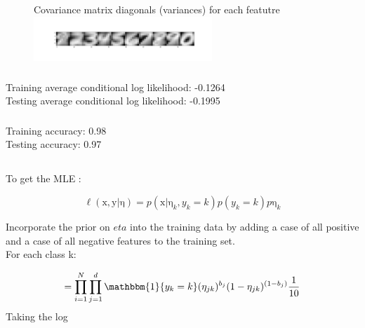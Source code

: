 \documentclass[12pt,letterpaper]{article} %
\newcommand{\bs}[1]{\bm{\mathrm{#1}}} %
\newcommand{\switch}[0]{\mathbbm{1}\{y_k=k\}}
\begin{document}
   \clearpage
  
  \subsubsection{}{}
  \begin{figure}[!h]
  \centering
  \caption{}{  Covariance matrix diagonals (variances) for each featutre}
   \includegraphics[width=0.6\textwidth, trim={3in 0in 0in 0in},clip=true ]{q2_2_eta.png}
\end{figure}
\FloatBarrier

  \subsubsection{}
  Training average conditional log likelihood: -0.1264 \\
  Testing average conditional log likelihood: -0.1995\\
  \subsubsection{}
  Training accuracy: 0.98\\
  Testing accuracy: 0.97
 \subsection{}
 
  \addtocounter{subsubsection}{1}
 \subsubsection{}
 To get the MLE :
 
 \begin{equation*}
  \ell(\bs{x},\bs{y} | \bs{\eta}) = p(\bs{x} | \bs{\eta}_k, y_k=k)p(y_k = k)p{\bs{\eta}_k}
 \end{equation*}

Incorporate the prior on  $eta$ into the training data by adding a case of all positive and a case of all negative features to the training set.\\
For each class k: 

 \begin{equation*}
 =\prod^N_{i=1}\prod^d_{j=1}\switch(\eta_{jk})^{b_j}(1-\eta_{jk})^{(1-{b_j})}\frac{1}{10}
 \end{equation*}
Taking the log 
\end{document}
